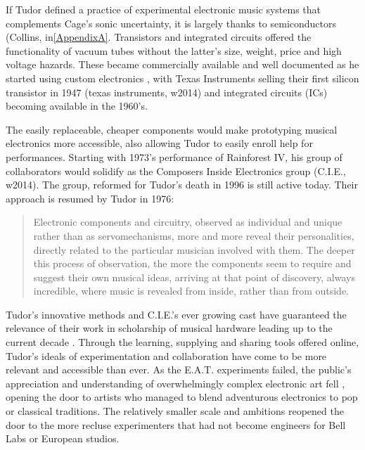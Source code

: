 If Tudor defined a practice of experimental electronic music systems that complements Cage’s sonic uncertainty, it is largely thanks to semiconductors (Collins, in\ref{AppendixA}. Transistors and integrated circuits offered the functionality of vacuum tubes without the latter’s size, weight, price and high voltage hazards. These became commercially available and well documented as he started using custom electronics \cite{collins2004}, with Texas Instruments selling their first silicon transistor in 1947 (texas instruments, w2014) and integrated circuits (ICs) becoming available in the 1960’s.  

The easily replaceable, cheaper components would make prototyping musical electronics more accessible, also allowing Tudor to easily enroll help for performances. Starting with 1973’s performance of Rainforest IV, his group of collaborators would solidify as the Composers Inside Electronics group (C.I.E., w2014). The group, reformed for Tudor’s death in 1996 is still active today. Their approach is resumed by Tudor in 1976: 

\begin{quote}
						
Electronic components and circuitry, observed as individual and unique rather than as servomechanisms, more and more reveal their personalities, directly related to the particular musician involved with them. The deeper this process of observation, the more the components seem to require and suggest their own musical ideas, arriving at that point of discovery, always incredible, where music is revealed from \‘inside,\’ rather than from \‘outside.\’ 
						
\citep{tudor1976,nakai2014}

\end{quote}

Tudor’s innovative methods and C.I.E.’s ever growing cast have guaranteed the relevance of their work in scholarship of musical hardware leading up to the current decade \cite{collins2004,collins2006,collins2008,collins2010,nakai2014,driscoll2004,kuivila2004}. Through the learning, supplying and sharing tools offered online, Tudor’s ideals of experimentation and collaboration have come to be more relevant and accessible than ever. As the E.A.T. experiments failed, the public's appreciation and understanding of overwhelmingly complex electronic art fell \cite{burnham1979}, opening the door to artists who managed to blend adventurous electronics to pop or classical traditions. The relatively smaller scale and ambitions reopened the door to the more recluse experimenters that had not become engineers for Bell Labs or European studios. 

